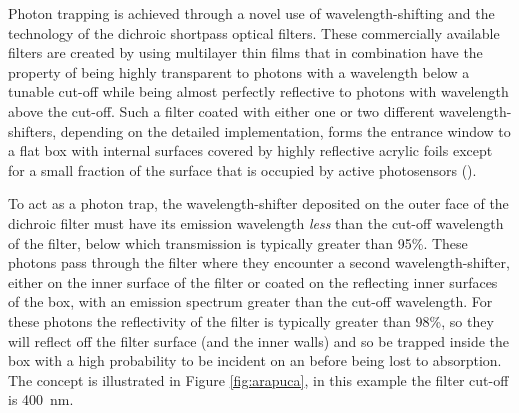 Photon trapping is achieved through a novel use of wavelength-shifting and the technology of the dichroic shortpass optical filters. These commercially available filters are created by using multilayer thin films that in combination have the property of being highly transparent to photons with a wavelength below a tunable cut-off while being almost perfectly reflective to photons with wavelength above the cut-off.  Such a filter coated with either one or two different wavelength-shifters, depending on the detailed implementation,  forms the entrance window to a flat box with internal surfaces covered by highly reflective acrylic foils
except for a small fraction of the surface that is occupied by active photosensors ().

To act as a photon trap, the wavelength-shifter deposited on the outer face of the dichroic filter must have its emission wavelength \textit{less} than the cut-off wavelength of the filter, below which transmission is typically greater than 95\%. These photons pass through the filter where they encounter a second wavelength-shifter, either on the inner surface of the filter or coated on the reflecting inner surfaces of the box,
with an emission spectrum greater than the cut-off wavelength. For these photons the reflectivity of the filter is typically greater than 98\%, so they will reflect off the filter surface (and the inner walls) and so be trapped inside the box with a high probability to be incident on an  before being lost to absorption. The concept is illustrated in Figure \ref{fig:arapuca}, in this example the filter cut-off is \SI{400}{nm}.



